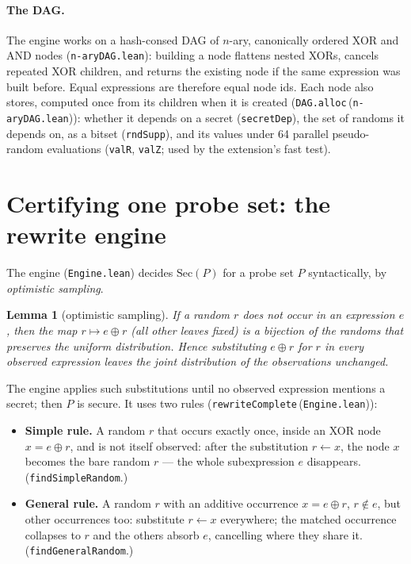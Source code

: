 \documentclass[11pt,a4paper]{article}
\newtheorem{lemma}[theorem]{Lemma}
\theoremstyle{definition}
\theoremstyle{remark}
\newcommand{\code}[1]{\texttt{\small #1}}
\newcommand{\lean}[2]{\code{#1}\,(\code{#2})}
\newcommand{\Sec}{\mathrm{Sec}}
\begin{document}
\paragraph{The DAG.}  The engine works on a hash-consed DAG of $n$-ary, canonically
ordered XOR and AND nodes (\code{n-aryDAG.lean}): building a node flattens nested XORs,
cancels repeated XOR children, and returns the existing node if the same expression was
built before.  Equal expressions are therefore equal node ids.  Each node also stores,
computed once from its children when it is created (\lean{DAG.alloc}{n-aryDAG.lean}):
whether it depends on a secret (\code{secretDep}), the set of randoms it depends on, as a
bitset (\code{rndSupp}), and its values under 64 parallel pseudo-random evaluations
(\code{valR}, \code{valZ}; used by the extension's fast test).

\section{Certifying one probe set: the rewrite engine}\label{sec:engine}

The engine (\code{Engine.lean}) decides $\Sec(P)$ for a probe set $P$ syntactically, by
\emph{optimistic sampling}.

\begin{lemma}[optimistic sampling]
If a random $r$ does not occur in an expression $e$, then the map $r \mapsto e\oplus r$
(all other leaves fixed) is a bijection of the randoms that preserves the uniform
distribution.  Hence substituting $e\oplus r$ for $r$ in every observed expression leaves
the joint distribution of the observations unchanged.
\end{lemma}

The engine applies such substitutions until no observed expression mentions a secret; then
$P$ is secure.  It uses two rules (\lean{rewriteComplete}{Engine.lean}):

\begin{itemize}[leftmargin=*]
\item \textbf{Simple rule.}  A random $r$ that occurs exactly once, inside an XOR node
  $x = e\oplus r$, and is not itself observed: after the substitution $r \leftarrow x$, the
  node $x$ becomes the bare random $r$ --- the whole subexpression $e$ disappears.
  (\code{findSimpleRandom}.)
\item \textbf{General rule.}  A random $r$ with an additive occurrence $x = e\oplus r$,
  $r\notin e$, but other occurrences too: substitute $r\leftarrow x$ everywhere; the matched
  occurrence collapses to $r$ and the others absorb $e$, cancelling where they share it.
  (\code{findGeneralRandom}.)
\end{itemize}
\end{document}
